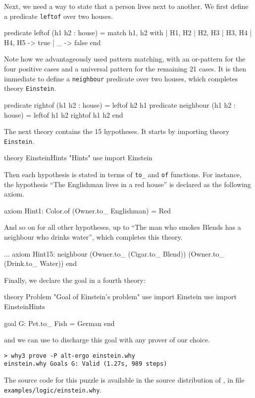 Next, we need a way to state that a person lives next to another. We
first define a predicate \texttt{leftof} over two houses.
\begin{whycode}
  predicate leftof (h1 h2 : house) =
    match h1, h2 with
    | H1, H2
    | H2, H3
    | H3, H4
    | H4, H5 -> true
    | _      -> false
    end
\end{whycode}
Note how we advantageously used pattern matching, with an or-pattern
for the four positive cases and a universal pattern for the remaining
21 cases. It is then immediate to define a \texttt{neighbour}
predicate over two houses, which completes theory \texttt{Einstein}.
\begin{whycode}
  predicate rightof (h1 h2 : house) =
    leftof h2 h1
  predicate neighbour (h1 h2 : house) =
    leftof h1 h2 \/ rightof h1 h2
end
\end{whycode}

The next theory contains the 15 hypotheses. It starts by importing
theory \texttt{Einstein}.
\begin{whycode}
theory EinsteinHints "Hints"
  use import Einstein
\end{whycode}
Then each hypothesis is stated in terms of \texttt{to\_} and \texttt{of}
functions. For instance, the hypothesis ``The Englishman lives in a
red house'' is declared as the following axiom.
\begin{whycode}
  axiom Hint1: Color.of (Owner.to_ Englishman) = Red
\end{whycode}
And so on for all other hypotheses, up to
``The man who smokes Blends has a neighbour who drinks water'', which completes
this theory.
\begin{whycode}
  ...
  axiom Hint15:
    neighbour (Owner.to_ (Cigar.to_ Blend)) (Owner.to_ (Drink.to_ Water))
end
\end{whycode}
Finally, we declare the goal in a fourth theory:
\begin{whycode}
theory Problem "Goal of Einstein's problem"
  use import Einstein
  use import EinsteinHints

  goal G: Pet.to_ Fish = German
end
\end{whycode}
and we can use \why to discharge this goal with any prover
of our choice.
\begin{verbatim}
> why3 prove -P alt-ergo einstein.why
einstein.why Goals G: Valid (1.27s, 989 steps)
\end{verbatim}
The source code for this puzzle is available in the source
distribution of \why, in file \verb|examples/logic/einstein.why|.

